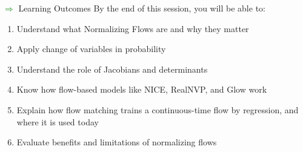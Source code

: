 \begin{frame}[allowframebreaks]{\textcolor{green}{$\Rightarrow$} Learning Outcomes}
    By the end of this session, you will be able to:
    \begin{enumerate}
        \setlength{\itemsep}{-0.1em}
        \item Understand what Normalizing Flows are and why they matter
        \item Apply change of variables in probability
        \item Understand the role of Jacobians and determinants
        \item Know how flow-based models like NICE, RealNVP, and Glow work
        \item Explain how flow matching trains a continuous-time flow by regression, and where it is used today
        \item Evaluate benefits and limitations of normalizing flows
    \end{enumerate}
\end{frame}